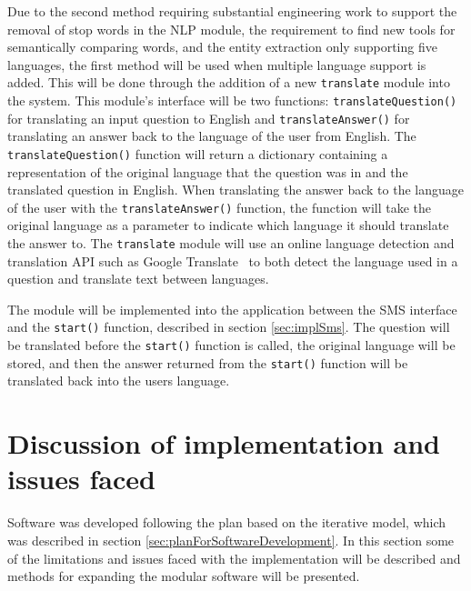 \documentclass[authoryearcitations]{UoYCSproject}
\begin{document}
Due to the second method requiring substantial engineering work to support the removal of stop words in the NLP module, the requirement to find new tools for semantically comparing words, and the entity extraction only supporting five languages, the first method will be used when multiple language support is added. This will be done through the addition of a new \texttt{translate} module into the system. This module's interface will be two functions: \texttt{translateQuestion()} for translating an input question to English and \texttt{translateAnswer()} for translating an answer back to the language of the user from English. The \texttt{translateQuestion()} function will return a dictionary containing a representation of the original language that the question was in and the translated question in English. When translating the answer back to the language of the user with the \texttt{translateAnswer()} function, the function will take the original language as a parameter to indicate which language it should translate the answer to. The \texttt{translate} module will use an online language detection and translation API such as Google Translate~\cite{googleTranslateApi} to both detect the language used in a question and translate text between languages. 

The module will be implemented into the application between the SMS interface and the \texttt{start()} function, described in section \ref{sec:implSms}. The question will be translated before the \texttt{start()} function is called, the original language will be stored, and then the answer returned from the \texttt{start()} function will be translated back into the users language.

\section{Discussion of implementation and issues faced}

Software was developed following the plan based on the iterative model, which was described in section \ref{sec:planForSoftwareDevelopment}. In this section some of the limitations and issues faced with the implementation will be described and methods for expanding the modular software will be presented.
\end{document}
